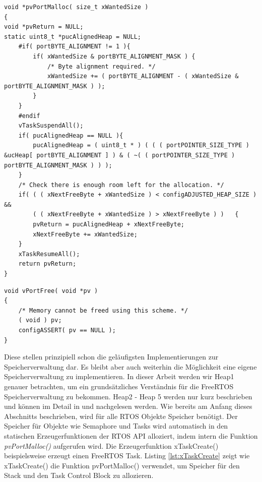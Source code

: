 \begin{lstlisting}[caption={FreeRTOS Source von pvPortMalloc() aus Heap1.c. Zuerst wird sichergestellt, dass die Startspeicheradresse dem byte-Alignment des $\mu$\-Pro\-zesso\-rs entspricht. Der STM32F4 basiert auf einem 32Bit $\mu$\-Pro\-zesso\-r und hat ein byte-Alignment von 4, sodass die Startadresse immer eine Potenz von 4 sein muss. Danach wird der Scheduler deaktiviert und geprüft, ob genug Speicher zur Verfügung steht. Abschließend wird der Speicher im ucHeap reserviert.  }, linewidth=8cm,captionpos=b, label=lst:malloc2, float=htb]
void *pvPortMalloc( size_t xWantedSize )
{
void *pvReturn = NULL;
static uint8_t *pucAlignedHeap = NULL;
	#if( portBYTE_ALIGNMENT != 1 ){
		if( xWantedSize & portBYTE_ALIGNMENT_MASK )	{
			/* Byte alignment required. */
			xWantedSize += ( portBYTE_ALIGNMENT - ( xWantedSize & portBYTE_ALIGNMENT_MASK ) );
		}
	}
	#endif
	vTaskSuspendAll();
	if( pucAlignedHeap == NULL ){
		pucAlignedHeap = ( uint8_t * ) ( ( ( portPOINTER_SIZE_TYPE ) &ucHeap[ portBYTE_ALIGNMENT ] ) & ( ~( ( portPOINTER_SIZE_TYPE ) portBYTE_ALIGNMENT_MASK ) ) );
	}
	/* Check there is enough room left for the allocation. */
	if( ( ( xNextFreeByte + xWantedSize ) < configADJUSTED_HEAP_SIZE ) &&
		( ( xNextFreeByte + xWantedSize ) > xNextFreeByte )	)	{
		pvReturn = pucAlignedHeap + xNextFreeByte;
		xNextFreeByte += xWantedSize;
	}
	xTaskResumeAll();
	return pvReturn;
}
\end{lstlisting}
\begin{lstlisting}[caption={FreeRTOS Source von vPortFree() aus Heap1.c . Da eine Speicherfreigabe in Heap1 nicht vorgesehen ist, ist diese Funktion leer.}, linewidth=8cm,captionpos=b, label=lst:free2, float=htb]
void vPortFree( void *pv )
{
	/* Memory cannot be freed using this scheme. */
	( void ) pv;
	configASSERT( pv == NULL );
}
\end{lstlisting} 
Diese stellen prinzipiell schon die ge\-läu\-figsten Implementierungen zur Speicherverwaltung dar. Es bleibt aber auch weiterhin die Möglichkeit eine eigene Speicherverwaltung zu implementieren. In dieser Arbeit werden wir Heap1 genauer betrachten, um ein grund\-sätz\-liches Ver\-ständ\-nis für die FreeRTOS Speicherverwaltung zu bekommen. Heap2 - Heap 5 werden nur kurz beschrieben und können im Detail in \cite{MasteringFreeRtos} und \cite{FreeRtosAdvanced} nachgelesen werden. Wie bereits am Anfang dieses Abschnitts beschrieben, wird für alle RTOS Objekte Speicher benötigt. Der Speicher für Objekte wie Semaphore und Tasks wird automatisch in den statischen Erzeugerfunktionen der RTOS API alloziert, indem intern die Funktion \textit{pvPortMalloc()} aufgerufen wird. Die Erzeugerfunktion xTaskCreate() beispielsweise erzeugt einen FreeRTOS Task. Listing \ref{lst:xTaskCreate} zeigt wie xTaskCreate() die Funktion pvPortMalloc() verwendet, um Speicher für den Stack und den Task Control Block zu allozieren.
